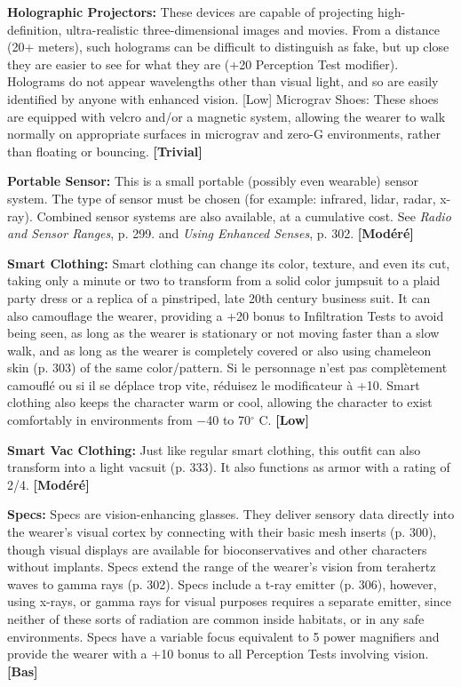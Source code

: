 {{\textbf{Holographic Projectors:} These devices are capable of projecting high-definition, ultra-realistic three-dimensional images and movies. From a distance (20+ meters), such holograms can be difficult to distinguish as fake, but up close they are easier to see for what they are (+20 Perception Test modifier). Holograms do not appear wavelengths other than visual light, and so are easily identified by anyone with enhanced vision. [Low] Micrograv Shoes: These shoes are equipped with velcro and/or a magnetic system, allowing the wearer to walk normally on appropriate surfaces in micrograv and zero-G environments, rather than floating or bouncing. \textbf{[Trivial]} 

\textbf{Portable Sensor:} This is a small portable (possibly even wearable) sensor system. The type of sensor must be chosen (for example: infrared, lidar, radar, x-ray). Combined sensor systems are also available, at a cumulative cost. See \emph{Radio and Sensor Ranges}, p. 299. and \emph{Using Enhanced Senses}, p. 302. \textbf{[Modéré]} 

\textbf{Smart Clothing:} Smart clothing can change its color, texture, and even its cut, taking only a minute or two to transform from a solid color jumpsuit to a plaid party dress or a replica of a pinstriped, late 20th century business suit. It can also camouflage the wearer, providing a +20 bonus to Infiltration Tests to avoid being seen, as long as the wearer is stationary or not moving faster than a slow walk, and as long as the wearer is completely covered or also using chameleon skin (p. 303) of the same color/pattern. Si le personnage n'est pas complètement camouflé ou si il se déplace trop vite, réduisez le modificateur à +10. Smart clothing also keeps the character warm or cool, allowing the character to exist comfortably in environments from $-$40 to 70$^{\circ}$ C. \textbf{[Low]} 

\textbf{Smart Vac Clothing:} Just like regular smart clothing, this outfit can also transform into a light vacsuit (p. 333). It also functions as armor with a rating of 2/4. \textbf{[Modéré]} 

\textbf{Specs:} Specs are vision-enhancing glasses. They deliver sensory data directly into the wearer’s visual cortex by connecting with their basic mesh inserts (p. 300), though visual displays are available for bioconservatives and other characters without implants. Specs extend the range of the wearer’s vision from terahertz waves to gamma rays (p. 302). Specs include a t-ray emitter (p. 306), however, using x-rays, or gamma rays for visual purposes requires a separate emitter, since neither of these sorts of radiation are common inside habitats, or in any safe environments. Specs have a variable focus equivalent to 5 power magnifiers and provide the wearer with a +10 bonus to all Perception Tests involving vision. \textbf{[Bas]} 

}}
